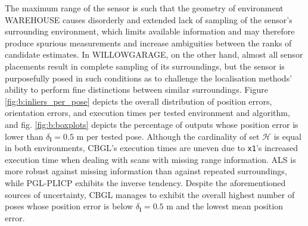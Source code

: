 The maximum range of the sensor is such that the geometry of environment
WAREHOUSE causes disorderly and extended lack of sampling of the sensor's
surrounding environment, which limits available information and may therefore
produce spurious measurements and increase ambiguities between the ranks of
candidate estimates. In WILLOWGARAGE, on the other hand, almost all sensor
placements result in complete sampling of its surroundings, but the sensor is
purposefully posed in such conditions as to challenge the localisation methods'
ability to perform fine distinctions between similar surroundings. Figure
\ref{fig:b:inliers_per_pose} depicts the overall distribution of position
errors, orientation errors, and execution times per tested environment and
algorithm, and fig. \ref{fig:b:boxplots} depicts the percentage of outputs
whose position error is lower than $\delta_{\bm{l}} = 0.5$ m per tested pose.
Although the cardinality of set $\mathcal{H}$ is equal in both environments,
CBGL's execution times are uneven due to \texttt{x1}'s increased execution time
when dealing with scans with missing range information. ALS is more robust
against missing information than against repeated surroundings, while PGL-PLICP
exhibits the inverse tendency. Despite the aforementioned sources of
uncertainty, CBGL manages to exhibit the overall highest number of poses whose
position error is below $\delta_{\bm{l}} = 0.5$ m and the lowest mean position
error.


